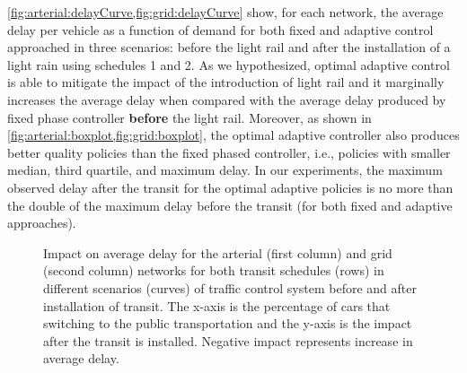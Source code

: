 %
\cref{fig:arterial:delayCurve,fig:grid:delayCurve} show, for each network, the
average delay per vehicle as a function of demand for both fixed and adaptive
control approached in three scenarios: before the light rail and after the
installation of a light rain using schedules 1 and 2.
%
As we hypothesized, optimal adaptive control is able to mitigate the impact of
the introduction of light rail and it marginally increases the average delay
when compared with the average delay produced by fixed phase controller
\textbf{before} the light rail.
%
Moreover, as shown in \cref{fig:arterial:boxplot,fig:grid:boxplot}, the optimal
adaptive controller also produces better quality policies than the fixed phased
controller, i.e., policies with smaller median, third quartile, and maximum
delay.
%
In our experiments, the maximum observed delay after the transit for the optimal
adaptive policies is no more than the double of the maximum delay before the
transit (for both fixed and adaptive approaches).



\begin{figure*}[t!] \centering
%
\caption{Impact on average delay for the arterial (first column) and grid
(second column) networks for both transit schedules (rows) in different
scenarios (curves) of traffic control system before and after installation of
transit.
%
The x-axis is the percentage of cars that switching to the public transportation
and the y-axis is the impact after the transit is installed.
%
Negative impact represents increase in average delay.}
%
\label{fig:impact} \end{figure*}



